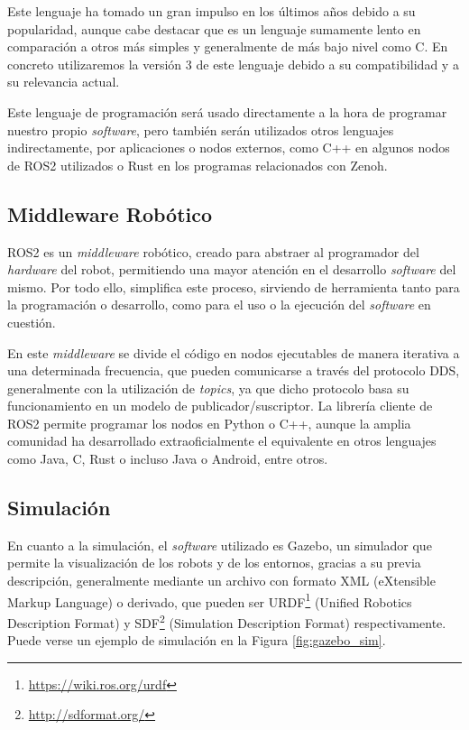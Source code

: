 Este lenguaje ha tomado un gran impulso en los últimos años debido a su
popularidad, aunque cabe destacar que es un lenguaje sumamente lento en
comparación a otros más simples y generalmente de más bajo nivel como C.
En concreto utilizaremos la versión 3 de este lenguaje debido a su
compatibilidad y a su relevancia actual.

Este lenguaje de programación será usado directamente a la hora de programar
nuestro propio \textit{software}, pero también serán utilizados otros lenguajes
indirectamente, por aplicaciones o nodos externos, como C++ en algunos nodos de
ROS2 utilizados o Rust en los programas relacionados con Zenoh.


\subsection{Middleware Robótico}
\label{sec:middleware_robotico}

ROS2 es un \textit{middleware} robótico, creado para abstraer al programador del
\textit{hardware} del robot, permitiendo una mayor atención en el desarrollo
\textit{software} del mismo.
Por todo ello, simplifica este proceso, sirviendo de herramienta tanto para la
programación o desarrollo, como para el uso o la ejecución del \textit{software}
en cuestión.

En este \textit{middleware} se divide el código en nodos ejecutables de manera
iterativa a una determinada frecuencia, que pueden comunicarse a través del
protocolo DDS, generalmente con la utilización de \textit{topics}, ya que dicho
protocolo basa su funcionamiento en un modelo de publicador/suscriptor.
La librería cliente de ROS2 permite programar los nodos en Python o C++, aunque
la amplia comunidad ha desarrollado extraoficialmente el equivalente en otros
lenguajes como Java, C, Rust o incluso Java o Android, entre otros.


\subsection{Simulación}
\label{sec:simulacion}

En cuanto a la simulación, el \textit{software} utilizado es Gazebo, un
simulador que permite la visualización de los robots y de los entornos, gracias
a su previa descripción, generalmente mediante un archivo con formato XML
(eXtensible Markup Language) o derivado, que pueden ser
URDF\footnote{\url{https://wiki.ros.org/urdf}} (Unified Robotics Description
Format) y SDF\footnote{\url{http://sdformat.org/}} (Simulation Description
Format) respectivamente.
Puede verse un ejemplo de simulación en la Figura \ref{fig:gazebo_sim}.

